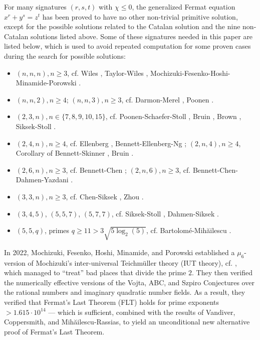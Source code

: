 \documentclass[a4paper, 12pt]{article}
\numberwithin{equation}{section}
\theoremstyle{definition}
\begin{document}
For many signatures $(r,s,t)$ with $\chi \le 0$, the generalized Fermat equation $x^r + y^s = z^t$ has been proved to have no other non-trivial primitive solution, except for the possible solutions related to the Catalan solution and the nine non-Catalan solutions listed above.
Some of these signatures needed in this paper are listed below, which is used to avoid repeated computation for some proven cases during the search for possible solutions:

\begin{itemize}
\setlength{\itemsep}{0pt}
\item $(n, n, n), n \ge 3$, cf. Wiles \cite{Wiles}, Taylor-Wiles \cite{Taylor-Wiles}, Mochizuki-Fesenko-Hoshi-Minamide-Porowski \cite{ExpEst}.

\item $(n, n, 2), n \ge 4$; $(n, n, 3), n \ge 3$, cf. Darmon-Merel \cite{Darmon-Merel}, Poonen \cite{Poonen}.

\item $(2, 3, n), n \in \{7, 8, 9, 10, 15\}$, cf. Poonen-Schaefer-Stoll \cite{Poonen-Schaefer-Stoll}, Bruin \cite{Bruin-16, Bruin-19}, Brown \cite{Brown_case_2_3_10}, Siksek-Stoll \cite{Siksek-Stoll_case_2_3_15}.

\item $(2, 4, n), n \ge 4$, cf. Ellenberg \cite{Ellenberg}, Bennett-Ellenberg-Ng \cite{Bennett-Ellenberg-Ng};
$(2, n, 4), n \ge 4$, Corollary of Bennett-Skinner \cite{Bennett-Skinner-8}, Bruin \cite{Bruin-18}.

\item $(2, 6, n), n \ge 3$, cf. Bennett-Chen \cite{Bennett-Chen};
$(2, n, 6), n \ge 3$, cf. Bennett-Chen-Dahmen-Yazdani \cite{Bennett-Chen-Dahmen-Yazdani}.

\item $(3, 3, n), n\ge 3$, cf. Chen-Siksek \cite{Chen-Siksek}, Zhou \cite{Diophantine_after_IUT_I}.

\item $(3, 4, 5)$, $(5, 5, 7)$, $(5, 7, 7)$, cf. Siksek-Stoll \cite{Siksek-Stoll}, Dahmen-Siksek \cite{Dahmen-Siksek}.

\item $(5, 5, q)$, primes $q \ge 11 > 3 \sqrt{5 \log_2(5)}$, cf. Bartolomé-Mih\u{a}ilescu \cite{semi_local_approximation_fermat_catalan_popular}.
\end{itemize}

In 2022, Mochizuki, Fesenko, Hoshi, Minamide, and Porowski \cite{ExpEst} established a $\mu_6$-version of Mochizuki's inter-universal Teichm\"uller theory (IUT theory), cf. \cite{IUTchI, IUTchII, IUTchIII, IUTchIV}, which managed to ``treat'' bad places that divide the prime $2$. They then verified the numerically effective versions of the Vojta, ABC, and Szpiro Conjectures over the rational numbers and imaginary quadratic number fields. As a result, they verified that Fermat’s Last Theorem (FLT) holds for prime exponents $> 1.615 \cdot 10^{14}$ — which is sufficient, combined with the results of Vandiver, Coppersmith, and Mih\u{a}ilescu-Rassias, to yield an unconditional new alternative proof of Fermat’s Last Theorem.
\end{document}
